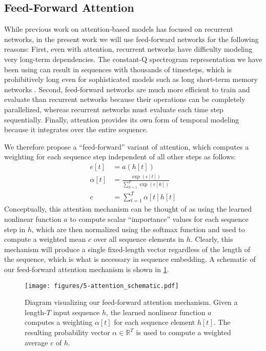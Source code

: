 \subsection{Feed-Forward Attention}

While previous work on attention-based models has focused on recurrent networks, in the present work we will use feed-forward networks for the following reasons:
First, even with attention, recurrent networks have difficulty modeling very long-term dependencies.
The constant-Q spectrogram representation we have been using can result in sequences with thousands of timesteps, which is prohibitively long even for sophisticated models such as long short-term memory networks \cite{hochreiter1997long}.
Second, feed-forward networks are much more efficient to train and evaluate than recurrent networks because their operations can be completely parallelized, whereas recurrent networks must evaluate each time step sequentially.
Finally, attention provides its own form of temporal modeling because it integrates over the entire sequence.

We therefore propose a ``feed-forward'' variant of attention, which computes a weighting for each sequence step independent of all other steps as follows:
\begin{align}
e[t] &= a(h[t])\\
\alpha[t] &= \frac{\exp(e[t])}{\sum_{k = 1}^T \exp(e[k])}\\
\label{eq:ffattention}
c &= \sum_{t = 1}^T \alpha[t] h[t]
\end{align}
Conceptually, this attention mechanism can be thought of as using the learned nonlinear function $a$ to compute scalar ``importance'' values for each sequence step in $h$, which are then normalized using the softmax function and used to compute a weighted mean $c$ over all sequence elements in $h$.
Clearly, this mechanism will produce a single fixed-length vector regardless of the length of the sequence, which is what is necessary in sequence embedding.
A schematic of our feed-forward attention mechanism is shown in \cref{fig:attention_schematic}.

\begin{figure}
  \texttt{[image: figures/5-attention\_schematic.pdf]}
  \caption[Feed-forward attention mechanism]{Diagram visualizing our feed-forward attention mechanism.
Given a length-$T$ input sequence $h$, the learned nonlinear function $a$ computes a weighting $\alpha[t]$ for each sequence element $h[t]$.
The resulting probability vector $\alpha \in \mathbb{R}^T$ is used to compute a weighted average $c$ of $h$.}
  \label{fig:attention_schematic}
\end{figure}

